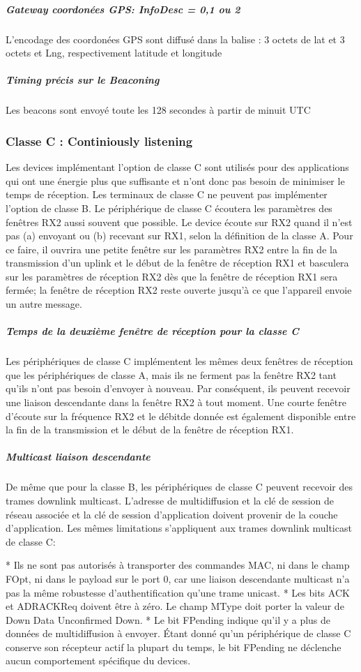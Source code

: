 \documentclass[11pt]{article}
\begin{document}
\subparagraph{ Gateway coordonées GPS: InfoDesc = 0,1 ou 2}
L'encodage des coordonées GPS sont diffusé dans la balise : 3 octets de lat et 3 octets et Lng, respectivement latitude et longitude
\subparagraph{ Timing précis sur le Beaconing}
Les beacons sont envoyé toute les 128 secondes à partir de minuit UTC 


\newpage
\subsubsection{Classe C : Continiously listening}
Les devices implémentant l'option de classe C sont utilisés pour des applications qui ont une énergie plus que suffisante et n'ont donc pas besoin de minimiser le temps de réception. Les terminaux de classe C ne peuvent pas implémenter l'option de classe B. Le périphérique de classe C écoutera les paramètres des fenêtres RX2 aussi souvent que possible. Le device écoute sur RX2 quand il n'est pas (a) envoyant ou (b) recevant sur RX1, selon la définition de la classe A. Pour ce faire, il ouvrira une petite fenêtre sur les paramètres RX2 entre la fin de la transmission d'un uplink et le début de la fenêtre de réception RX1 et basculera sur les paramètres de réception RX2 dès que la fenêtre de réception RX1 sera fermée; la fenêtre de réception RX2 reste ouverte jusqu'à ce que l'appareil  envoie un autre message.
\subparagraph{Temps de la deuxième fenêtre de réception pour la classe C}
Les périphériques de classe C implémentent les mêmes deux fenêtres de réception que les périphériques de classe A, mais ils ne ferment pas la fenêtre RX2 tant qu'ils n'ont pas besoin d'envoyer à nouveau. Par conséquent, ils peuvent recevoir une liaison descendante dans la fenêtre RX2 à tout moment. Une courte fenêtre d'écoute sur la fréquence RX2 et le débitde donnée est également disponible entre la fin de la transmission et le début de la fenêtre de réception RX1.
\subparagraph{ Multicast liaison descendante}
De même que pour la classe B, les périphériques de classe C peuvent recevoir des trames downlink multicast. L'adresse de multidiffusion et la clé de session de réseau associée et la clé de session d'application doivent provenir de la couche d'application. Les mêmes limitations s'appliquent aux trames downlink multicast de classe C:

* Ils ne sont pas autorisés à transporter des commandes MAC, ni dans le champ FOpt, ni dans le payload sur le port 0, car une liaison descendante multicast n'a pas la même robustesse d'authentification qu'une trame unicast.
* Les bits ACK et ADRACKReq doivent être à zéro. Le champ MType doit porter la valeur de Down Data Unconfirmed Down.
* Le bit FPending indique qu'il y a plus de données de multidiffusion à envoyer. Étant donné qu'un périphérique de classe C conserve son récepteur actif la plupart du temps, le bit FPending ne déclenche aucun comportement spécifique du devices.
\end{document}

